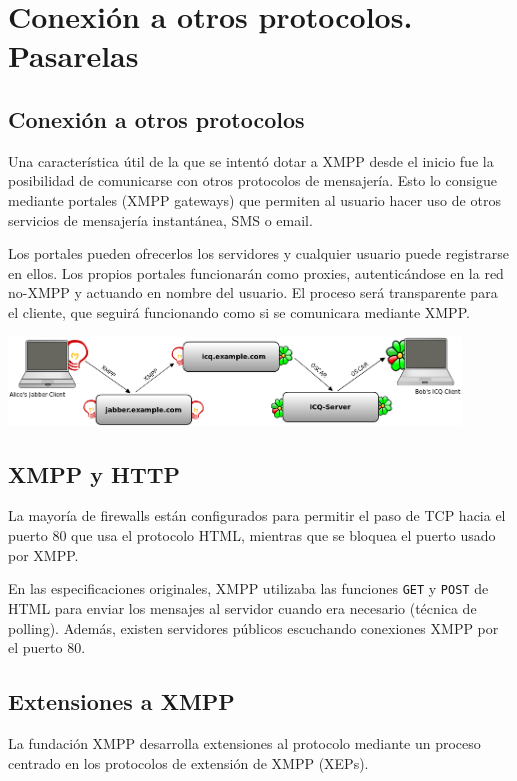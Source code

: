\documentclass[a4paper, 11pt]{article} %
\begin{document}
      
\section{Conexión a otros protocolos. Pasarelas}
  \subsection{Conexión a otros protocolos}
    Una característica útil de la que se intentó dotar a XMPP desde el inicio
    fue la posibilidad de comunicarse con otros protocolos de mensajería.
    Esto lo consigue mediante portales (XMPP gateways) que permiten al usuario
    hacer uso de otros servicios de mensajería instantánea, SMS o email.
    
    Los portales pueden ofrecerlos los servidores y cualquier usuario puede
    registrarse en ellos. Los propios portales funcionarán como proxies,
    autenticándose en la red no-XMPP y actuando en nombre del usuario.
    El proceso será transparente para el cliente, que seguirá funcionando
    como si se comunicara mediante XMPP.
    
    \begin{center}
      \includegraphics[width=12cm]{external.png}
    \end{center}
    
  \subsection{XMPP y HTTP}
    La mayoría de firewalls están configurados para permitir el 
    paso de TCP hacia el puerto 80 que usa el protocolo HTML, mientras que
    se bloquea el puerto usado por XMPP.
    
    En las especificaciones originales, XMPP utilizaba las funciones \texttt{GET} y
    \texttt{POST} de HTML para enviar los mensajes al servidor cuando era necesario
    (técnica de polling). Además, existen servidores públicos escuchando conexiones
    XMPP por el puerto 80.
    

  \subsection{Extensiones a XMPP}
    La fundación XMPP desarrolla extensiones al protocolo mediante un proceso
    centrado en los protocolos de extensión de XMPP (XEPs).
    
\end{document}
